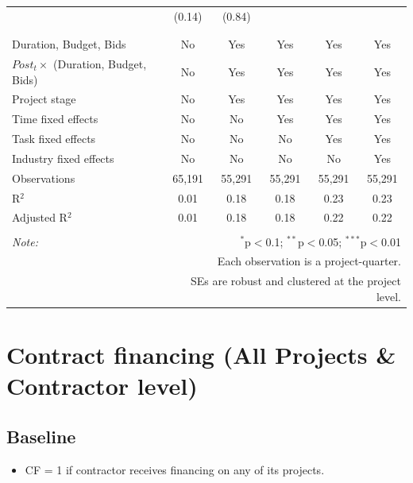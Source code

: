 \documentclass[
]{article}
\providecommand{\tightlist}{%
  \setlength{\itemsep}{0pt}\setlength{\parskip}{0pt}}
\begin{document}
\begin{table}[H]
\begin{tabular}{@{\extracolsep{-2pt}}lccccc}
  & (0.14) & (0.84) &  &  &  \\ 
  & & & & & \\ 
\hline \\[-1.8ex] 
Duration, Budget, Bids & No & Yes & Yes & Yes & Yes \\ 
$Post_t \times $  (Duration, Budget, Bids) & No & Yes & Yes & Yes & Yes \\ 
Project stage & No & Yes & Yes & Yes & Yes \\ 
Time fixed effects & No & No & Yes & Yes & Yes \\ 
Task fixed effects & No & No & No & Yes & Yes \\ 
Industry fixed effects & No & No & No & No & Yes \\ 
Observations & 65,191 & 55,291 & 55,291 & 55,291 & 55,291 \\ 
R$^{2}$ & 0.01 & 0.18 & 0.18 & 0.23 & 0.23 \\ 
Adjusted R$^{2}$ & 0.01 & 0.18 & 0.18 & 0.22 & 0.22 \\ 
\hline 
\hline \\[-1.8ex] 
\textit{Note:}  & \multicolumn{5}{r}{$^{*}$p$<$0.1; $^{**}$p$<$0.05; $^{***}$p$<$0.01} \\ 
 & \multicolumn{5}{r}{Each observation is a project-quarter.} \\ 
 & \multicolumn{5}{r}{SEs are robust and clustered at the project level.} \\ 
\end{tabular} 
\end{table}

\hypertarget{contract-financing-all-projects-contractor-level}{%
\section{Contract financing (All Projects \& Contractor
level)}\label{contract-financing-all-projects-contractor-level}}

\hypertarget{baseline}{%
\subsection{Baseline}\label{baseline}}

\begin{itemize}
\tightlist
\item
  CF = 1 if contractor receives financing on any of its projects.
\end{itemize}
\end{document}
